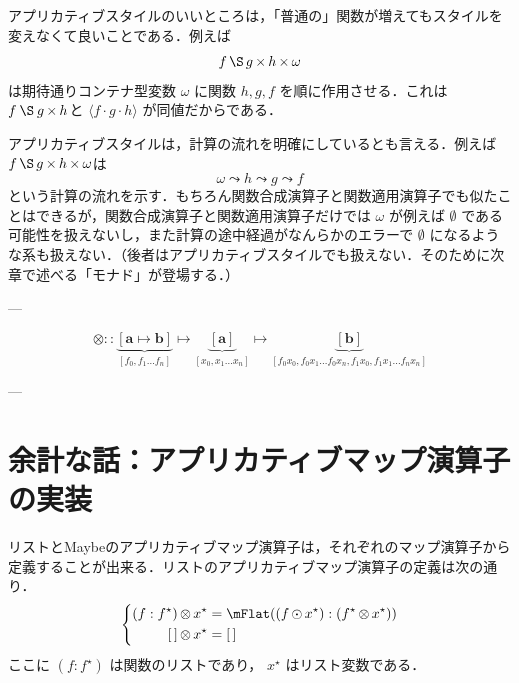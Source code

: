 \documentclass[a4paper]{jsbook}
\newcommand{\mType}[1]{\mathbf{#1}}
\newcommand{\mListType}[1]{[\mType{#1}]}
\newcommand{\mNothing}{\emptyset}
\newcommand{\mPureWith}[1]{\langle#1\rangle}
\newcommand{\mList}[1]{{#1}^\mathrm{\star}}
\DeclareMathOperator{\mMapsTo}{\mapsto}
\DeclareMathOperator{\mComp}{\cdot}
\DeclareMathOperator{\mFlow}{\leadsto}
\DeclareMathOperator{\mMapList}{\odot}
\DeclareMathOperator{\mApplicativeApply}{\S}
\DeclareMathOperator{\mApplicativeMap}{\times}
\DeclareMathOperator{\mApplicativeMapList}{\otimes}
\newcommand{\mathTypeParameter}[1]{\mathbf{#1}}
\newcommand{\mathListWith}[1]{\left[#1\right]}
\newcommand{\mathApplicativeApply}{\mathbin{\S}}
\newcommand{\mathApplicativeMap}{\mathbin{\otimes}}
\newcommand{\mathIn}{\mathrel{::}}
\begin{document}
アプリカティブスタイルのいいところは，「普通の」関数が増えてもスタイルを変えなくて良いことである．例えば
\begin{equation}
f\mApplicativeApply g\mApplicativeMap h\mApplicativeMap\omega
\end{equation}
は期待通りコンテナ型変数 $\omega$ に関数 $h,g,f$ を順に作用させる．これは $f\mathApplicativeApply g\mApplicativeMap h$と $\mPureWith{f\mComp g\mComp h}$ が同値だからである．

アプリカティブスタイルは，計算の流れを明確にしているとも言える．例えば $f\mApplicativeApply g\mApplicativeMap h\mApplicativeMap\omega$は
\begin{equation}
\omega\mFlow h\mFlow g\mFlow f
\end{equation}
という計算の流れを示す．もちろん関数合成演算子と関数適用演算子でも似たことはできるが，関数合成演算子と関数適用演算子だけでは $\omega$ が例えば $\mNothing$ である可能性を扱えないし，また計算の途中経過がなんらかのエラーで $\mNothing$ になるような系も扱えない．（後者はアプリカティブスタイルでも扱えない．そのために次章で述べる「モナド」が登場する．）

---


\begin{equation*}
\mathApplicativeMap\mathIn
\underbrace{\mathListWith{\mathTypeParameter{a}\mMapsTo\mathTypeParameter{b}}}_{\mathListWith{f_0,f_1\dots f_n}}
\mMapsTo
\underbrace{\mListType{a}}_{\mathListWith{x_0,x_1\dots x_n}}
\mMapsTo
\underbrace{\mListType{\mathTypeParameter{b}}}_{\mathListWith{f_0x_0,f_0x_1\dots f_0x_n,f_1x_0,f_1x_1\dots f_nx_n}}
\end{equation*}

---



\section{余計な話：アプリカティブマップ演算子の実装}

リストとMaybeのアプリカティブマップ演算子は，それぞれのマップ演算子から定義することが出来る．リストのアプリカティブマップ演算子の定義は次の通り．
\begin{equation}
\left\{
\begin{split}
(f:\mList{f})\mApplicativeMapList\mList{x}&=\mFlat((f\mMapList\mList{x}):(\mList{f}\mApplicativeMapList\mList{x}))\\
\mEmptyList\mApplicativeMapList\mList{x}&=\mEmptyList
\end{split}
\right.
\end{equation}
ここに $(f:\mList{f})$ は関数のリストであり， $\mList{x}$ はリスト変数である．
\end{document}
